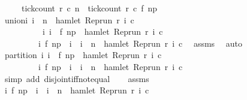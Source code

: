 \begin{isabellebody}
\ \ \ \ \ {\isacartoucheopen}tick{\isacharunderscore}count\ r\ c\ n\ {\isacharequal}\ tick{\isacharunderscore}count\ r\ c\ {\isacharparenleft}f\ n\isactrlsub p{\isacharparenright}{\isacartoucheclose}\isanewline
%
\isadelimproof
%
\endisadelimproof
%
\isatagproof
{}\isamarkupfalse%
\ {\isacharminus}\isanewline
\ \ \isamarkupfalse%
\ union{\isacharcolon}{\isacartoucheopen}{\isacharbraceleft}i{\isachardot}\ i\ {\isasymle}\ n\ {\isasymand}\ hamlet\ {\isacharparenleft}{\isacharparenleft}Rep{\isacharunderscore}run\ r{\isacharparenright}\ i\ c{\isacharparenright}{\isacharbraceright}\ {\isacharequal}\isanewline
\ \ \ \ \ \ \ \ \ \ {\isacharbraceleft}i{\isachardot}\ i\ {\isasymle}\ f\ n\isactrlsub p\ {\isasymand}\ hamlet\ {\isacharparenleft}{\isacharparenleft}Rep{\isacharunderscore}run\ r{\isacharparenright}\ i\ c{\isacharparenright}{\isacharbraceright}\isanewline
\ \ \ \ \ \ \ \ {\isasymunion}\ {\isacharbraceleft}i{\isachardot}\ f\ n\isactrlsub p\ {\isacharless}\ i\ {\isasymand}\ i\ {\isasymle}\ n\ {\isasymand}\ hamlet\ {\isacharparenleft}{\isacharparenleft}Rep{\isacharunderscore}run\ r{\isacharparenright}\ i\ c{\isacharparenright}{\isacharbraceright}{\isacartoucheclose}\ \isamarkupfalse%
\ assms{\isacharparenleft}{}{\isacharparenright}\ \isamarkupfalse%
\ auto\isanewline
\ \ \isamarkupfalse%
\ partition{\isacharcolon}\ {\isacartoucheopen}{\isacharbraceleft}i{\isachardot}\ i\ {\isasymle}\ f\ n\isactrlsub p\ {\isasymand}\ hamlet\ {\isacharparenleft}{\isacharparenleft}Rep{\isacharunderscore}run\ r{\isacharparenright}\ i\ c{\isacharparenright}{\isacharbraceright}\isanewline
\ \ \ \ \ \ \ \ {\isasyminter}\ {\isacharbraceleft}i{\isachardot}\ f\ n\isactrlsub p\ {\isacharless}\ i\ {\isasymand}\ i\ {\isasymle}\ n\ {\isasymand}\ hamlet\ {\isacharparenleft}{\isacharparenleft}Rep{\isacharunderscore}run\ r{\isacharparenright}\ i\ c{\isacharparenright}{\isacharbraceright}\ {\isacharequal}\ {\isacharbraceleft}{\isacharbraceright}{\isacartoucheclose}\isanewline
\ \ \ \ \isamarkupfalse%
\ {\isacharparenleft}simp\ add{\isacharcolon}\ disjoint{\isacharunderscore}iff{\isacharunderscore}not{\isacharunderscore}equal{\isacharparenright}\isanewline
\ \ \isamarkupfalse%
\ assms\ \isamarkupfalse%
\ {\isacartoucheopen}{\isacharbraceleft}i{\isachardot}\ f\ n\isactrlsub p\ {\isacharless}\ i\ {\isasymand}\ i\ {\isasymle}\ n\ {\isasymand}\ hamlet\ {\isacharparenleft}{\isacharparenleft}Rep{\isacharunderscore}run\ r{\isacharparenright}\ i\ c{\isacharparenright}{\isacharbraceright}\ {\isacharequal}\ {\isacharbraceleft}{\isacharbraceright}{\isacartoucheclose}\isanewline

\end{isabellebody}
